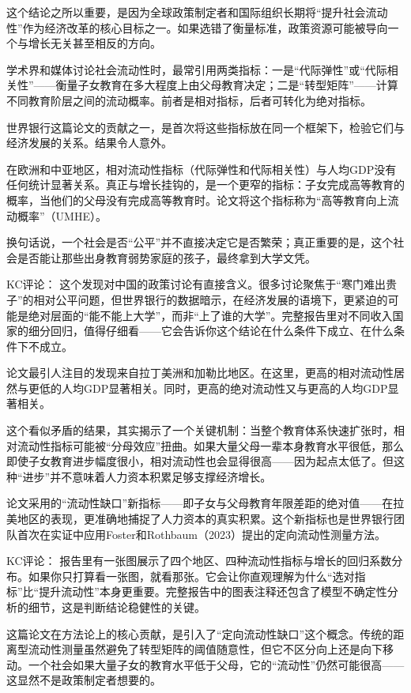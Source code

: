 \documentclass[11pt]{ctexart}
\begin{document}
这个结论之所以重要，是因为全球政策制定者和国际组织长期将“提升社会流动性”作为经济改革的核心目标之一。如果选错了衡量标准，政策资源可能被导向一个与增长无关甚至相反的方向。

学术界和媒体讨论社会流动性时，最常引用两类指标：一是“代际弹性”或“代际相关性”——衡量子女教育在多大程度上由父母教育决定；二是“转型矩阵”——计算不同教育阶层之间的流动概率。前者是相对指标，后者可转化为绝对指标。

世界银行这篇论文的贡献之一，是首次将这些指标放在同一个框架下，检验它们与经济发展的关系。结果令人意外。

在欧洲和中亚地区，相对流动性指标（代际弹性和代际相关性）与人均GDP没有任何统计显著关系。真正与增长挂钩的，是一个更窄的指标：子女完成高等教育的概率，当他们的父母没有完成高等教育时。论文将这个指标称为“高等教育向上流动概率”（UMHE）。

换句话说，一个社会是否“公平”并不直接决定它是否繁荣；真正重要的是，这个社会是否能让那些出身教育弱势家庭的孩子，最终拿到大学文凭。

KC评论： 这个发现对中国的政策讨论有直接含义。很多讨论聚焦于“寒门难出贵子”的相对公平问题，但世界银行的数据暗示，在经济发展的语境下，更紧迫的可能是绝对层面的“能不能上大学”，而非“上了谁的大学”。完整报告里对不同收入国家的细分回归，值得仔细看——它会告诉你这个结论在什么条件下成立、在什么条件下不成立。

论文最引人注目的发现来自拉丁美洲和加勒比地区。在这里，更高的相对流动性居然与更低的人均GDP显著相关。同时，更高的绝对流动性又与更高的人均GDP显著相关。

这个看似矛盾的结果，其实揭示了一个关键机制：当整个教育体系快速扩张时，相对流动性指标可能被“分母效应”扭曲。如果大量父母一辈本身教育水平很低，那么即使子女教育进步幅度很小，相对流动性也会显得很高——因为起点太低了。但这种“进步”并不意味着人力资本积累足够支撑经济增长。

论文采用的“流动性缺口”新指标——即子女与父母教育年限差距的绝对值——在拉美地区的表现，更准确地捕捉了人力资本的真实积累。这个新指标也是世界银行团队首次在实证中应用Foster和Rothbaum（2023）提出的定向流动性测量方法。

KC评论： 报告里有一张图展示了四个地区、四种流动性指标与增长的回归系数分布。如果你只打算看一张图，就看那张。它会让你直观理解为什么“选对指标”比“提升流动性”本身更重要。完整报告中的图表注释还包含了模型不确定性分析的细节，这是判断结论稳健性的关键。

这篇论文在方法论上的核心贡献，是引入了“定向流动性缺口”这个概念。传统的距离型流动性测量虽然避免了转型矩阵的阈值随意性，但它不区分向上还是向下移动。一个社会如果大量子女的教育水平低于父母，它的“流动性”仍然可能很高——这显然不是政策制定者想要的。
\end{document}
